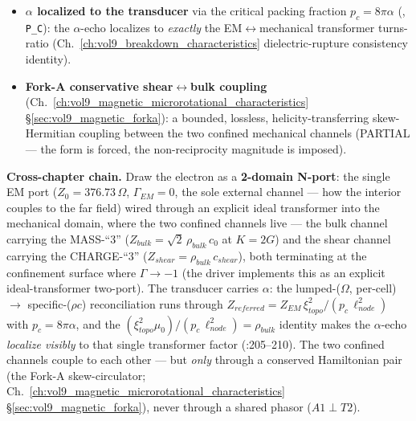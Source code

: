 \begin{itemize}
    \item \textbf{$\alpha$ localized to the transducer} via the critical packing fraction $p_c = 8\pi\alpha$ (, \texttt{P\_C}): the $\alpha$-echo localizes to \emph{exactly} the EM$\leftrightarrow$mechanical transformer turns-ratio (Ch.~\ref{ch:vol9_breakdown_characteristics} dielectric-rupture consistency identity).
    \item \textbf{Fork-A conservative shear$\leftrightarrow$bulk coupling} (Ch.~\ref{ch:vol9_magnetic_microrotational_characteristics} \S\ref{sec:vol9_magnetic_forka}): a bounded, lossless, helicity-transferring skew-Hermitian coupling between the two confined mechanical channels (PARTIAL --- the form is forced, the non-reciprocity magnitude is imposed).
\end{itemize}

\textbf{Cross-chapter chain.} Draw the electron as a \textbf{2-domain N-port}: the single EM port ($Z_0 = 376.73\,\Omega$, $\Gamma_{EM} = 0$, the sole external channel --- how the interior couples to the far field) wired through an explicit ideal transformer into the mechanical domain, where the two confined channels live --- the bulk channel carrying the MASS-``3'' ($Z_{bulk} = \sqrt{2}\,\rho_{bulk}\, c_0$ at $K = 2G$) and the shear channel carrying the CHARGE-``3'' ($Z_{shear} = \rho_{bulk}\, c_{shear}$), both terminating at the confinement surface where $\Gamma \to -1$\gammaundeclared{} (the driver  implements this as an explicit ideal-transformer two-port). The transducer carries $\alpha$: the lumped-($\Omega$, per-cell) $\to$ specific-($\rho c$) reconciliation runs through $Z_{referred} = Z_{EM}\,\xi_{topo}^2/(p_c\,\ell_{node}^2)$ with $p_c = 8\pi\alpha$, and the $(\xi_{topo}^2\mu_0)/(p_c\,\ell_{node}^2) = \rho_{bulk}$ identity makes the $\alpha$-echo \emph{localize visibly} to that single transformer factor (:205--210). The two confined channels couple to each other --- but \emph{only} through a conserved Hamiltonian pair (the Fork-A skew-circulator; Ch.~\ref{ch:vol9_magnetic_microrotational_characteristics} \S\ref{sec:vol9_magnetic_forka}), never through a shared phasor ($A1 \perp T2$).

